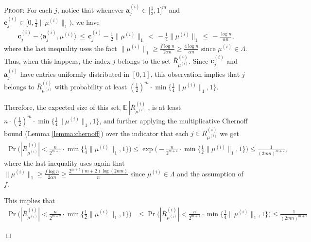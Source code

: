 \documentclass{article}
\newcommand{\E}{\mathbb{E}}
\newcommand{\ip}{\iprods}
\newcommand{\av}[0]{\mathbf{a}}
\newcommand{\cv}[0]{\mathbf{c}}
\newcommand{\normm}[1]{\big\lVert#1\big\rVert}
\newcommand{\iprods}[2]{\langle {#1}, {#2} \rangle}
\newcommand{\colij}{\av^{(i)}_j}
\newcommand{\nrc}{R}
\newenvironment{proof}[1][]
   {\textsc{Proof#1: }}
   {\hfill$\Box$\smallskip}
\begin{document}
\begin{proof}    
    For each $j$, notice that whenever $\colij \in \big[\frac{1}{2}, 1\big]^m$ and $\cv_j^{(i)} \in \big[0,\frac{1}{4} \normm{\mu^{(i)}}_1\big)$, we have
    \begin{align*}
        \cv^{(i)}_j - \ip{\colij}{\mu^{(i)}} \,\le\, \cv^{(i)}_j - \frac{1}{2} \normm{\mu^{(i)}}_1 \,<\, -\frac{1}{4} \normm{\mu^{(i)}}_1 \,\le\, -\frac{\log n}{\alpha n},
    \end{align*}
where the last inequality uses the fact $\normm{\mu^{(i)}}_1 \ge \frac{f \log n}{2 \alpha n} \ge \frac{4 \log n}{\alpha n}$ since $\mu^{(i)} \in \Lambda$. Thus, when this happens, the index $j$ belongs to the set $\overline{\nrc}^{(i)}_{\mu^{(i)}}$. Since $\cv_j^{(i)}$ and $\colij$ have entries uniformly distributed in $[0,1]$, this observation implies that $j$ belongs to $\overline{\nrc}^{(i)}_{\mu^{(i)}}$ with probability at least $(\frac{1}{2})^m \cdot \min\{ \frac{1}{{4}} \normm{\mu^{(i)}}_1, 1\}$. 

Therefore, the expected size of this set, $\E\, |\overline{\nrc}^{(i)}_{\mu^{(i)}}|$, is at least $n \cdot (\frac{1}{2})^m \cdot \min\{ \frac{1}{{4}} \normm{\mu^{(i)}}_1, 1\}$, and further applying the multiplicative Chernoff bound (Lemma \ref{lemma:chernoff}) over the indicator that each $j \in \overline{\nrc}^{(i)}_{\mu^{(i)}}$ we get
%
\begin{align*}
    \Pr\bigg( |\overline{\nrc}^{(i)}_{\mu^{(i)}}| < \frac{n}{2^{m+1}} \cdot \min\bigg\{ \frac{1}{{4}} \normm{\mu^{(i)}}_1, 1\bigg\} \bigg) \le \exp\bigg(- \frac{n}{2^{m+4}} \cdot \min\bigg\{  \frac{1}{{2}} \normm{\mu^{(i)}}_1, 1\bigg\}\bigg) \le \frac{1}{(2mn)^{m+2}},
\end{align*}
where the last inequality uses again that $\|\mu^{(i)}\|_1 \ge \frac{f\log n}{2 \alpha n}\ge \frac{2^{m+{5}} (m+{2}) \log (2mn)}{n}$ since $\mu^{(i)} \in \Lambda$ and the assumption of $f$.

This implies that 
\begin{align*}
    \Pr\bigg( |\overline{\nrc}^{(i)}_{\mu^{(i)}}| < \frac{n}{2^{m+{2}}} \cdot \min\bigg\{ \frac{1}{{2}} \normm{\mu^{(i)}}_1, 1\bigg\} \bigg) & \leq \Pr\bigg( |\overline{\nrc}^{(i)}_{\mu^{(i)}}| < \frac{n}{2^{m+1}} \cdot \min\bigg\{ \frac{1}{{4}} \normm{\mu^{(i)}}_1, 1\bigg\} \bigg) \leq \frac{1}{(2mn)^{m+{2}}}
\end{align*}


\end{proof}
\end{document}
